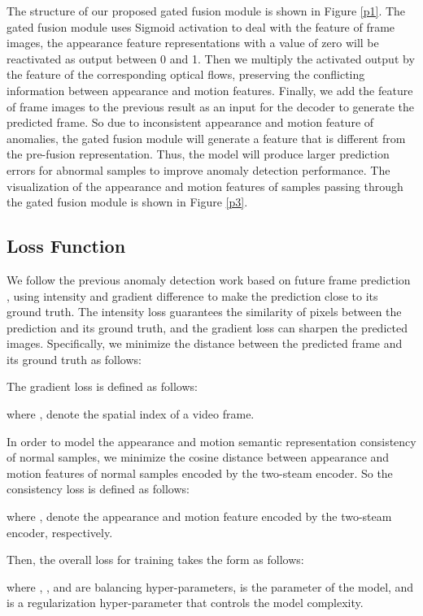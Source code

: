 \documentclass[sigconf]{acmart}
\begin{document}
The structure of our proposed gated fusion module is shown in Figure \ref{p1}. The gated fusion module uses Sigmoid activation to deal with the feature of frame images, the appearance feature representations with a value of zero will be reactivated as output between 0 and 1. Then we multiply the activated output by the feature of the corresponding optical flows, preserving the conflicting information between appearance and motion features. Finally, we add the feature of frame images to the previous result as an input for the decoder to generate the predicted frame. So due to inconsistent appearance and motion feature of anomalies, the gated fusion module will generate a feature that is different from the pre-fusion representation. Thus, the model will produce larger prediction errors for abnormal samples to improve anomaly detection performance. The visualization of the appearance and motion features of samples passing through the gated fusion module is shown in Figure \ref{p3}.

\subsection{Loss Function}
We follow the previous anomaly detection work based on future frame prediction \cite{liu2018future}, using intensity and gradient difference to make the prediction close to its ground truth. The intensity loss guarantees the similarity of pixels between the prediction and its ground truth, and the gradient loss can sharpen the predicted images. Specifically, we minimize the  distance between the predicted frame  and its ground truth  as follows:


The gradient loss is defined as follows:

where ,  denote the spatial index of a video frame.

In order to model the appearance and motion semantic representation consistency of normal samples, we minimize the cosine distance between appearance and motion features of normal samples encoded by the two-steam encoder. So the consistency loss is defined as follows:

where ,  denote the appearance and motion feature encoded by the two-steam encoder, respectively.

Then, the overall loss  for training takes the form as follows:

where , , and  are balancing hyper-parameters,  is the parameter of the model, and  is a regularization hyper-parameter that controls the model complexity. 
\end{document}
